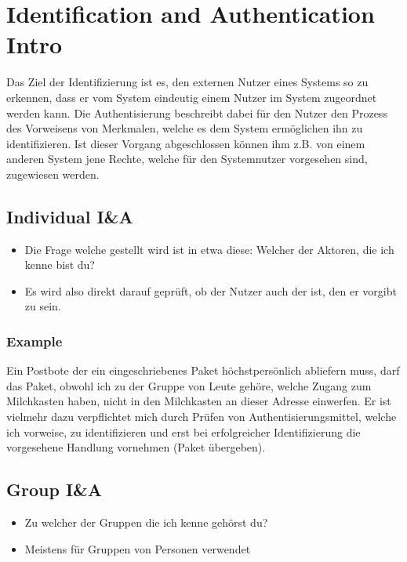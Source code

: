 \chapter{Identification and Authentication Intro}
Das Ziel der Identifizierung ist es, den externen Nutzer eines Systems so zu erkennen, dass er vom System eindeutig einem Nutzer im System zugeordnet werden kann. Die Authentisierung beschreibt dabei für den Nutzer den Prozess des Vorweisens von Merkmalen, welche es dem System ermöglichen ihn zu identifizieren. Ist dieser Vorgang abgeschlossen können ihm z.B. von einem anderen System jene Rechte, welche für den Systemnutzer vorgesehen sind, zugewiesen werden.

\section{Individual I\&A}
\begin{itemize}
  \item Die Frage welche gestellt wird ist in etwa diese: Welcher der Aktoren, die ich kenne bist du?
  \item Es wird also direkt darauf geprüft, ob der Nutzer auch der ist, den er vorgibt zu sein.
\end{itemize}
\subsection{Example}
Ein Postbote der ein eingeschriebenes Paket höchstpersönlich abliefern muss, darf das Paket, obwohl ich zu der Gruppe von Leute gehöre, welche Zugang zum Milchkasten haben, nicht in den Milchkasten an dieser Adresse einwerfen. Er ist vielmehr dazu verpflichtet mich durch Prüfen von Authentisierungsmittel, welche ich vorweise, zu identifizieren und erst bei erfolgreicher Identifizierung die vorgesehene Handlung vornehmen (Paket übergeben).

\section{Group I\&A}
\begin{itemize}
  \item Zu welcher der Gruppen die ich kenne gehörst du?
  \item Meistens für Gruppen von Personen verwendet
\end{itemize}

